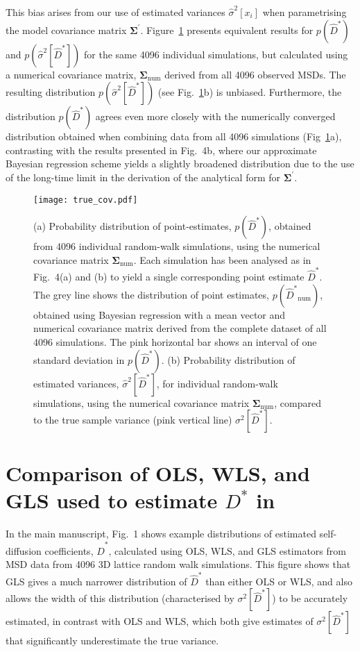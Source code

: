 \documentclass[reprint,superscriptaddress,nobibnotes,amsmath,amssymb,aps,prx,hidelinks]{revtex4-2}
\newcommand{\oMSDi}{\ensuremath{x_i}}
\newcommand{\prob}[1]{\ensuremath{p(#1)}}
\newcommand{\Dest}{\ensuremath{\widehat{D}^*}}
\newcommand{\D}{\ensuremath{D^*}}
\newcommand{\var}[1]{\ensuremath{\sigma^2[#1]}}
\newcommand{\varest}[1]{\ensuremath{\widehat{\sigma}^2[#1]}}
\begin{document}
This bias arises from our use of estimated variances $\varest{\oMSDi}$ when parametrising the model covariance matrix $\bm{\Sigma^\prime}$.
Figure~\ref{fig:true_cov} presents equivalent results for $\prob{\Dest}$ and $\prob{\varest{\Dest}}$ for the same \num{4096} individual simulations, but calculated using a numerical covariance matrix, $\bm{\Sigma}_\mathrm{num}$ derived from all \num{4096} observed MSDs.
The resulting distribution $\prob{\varest{\Dest}}$ (see Fig.~\ref{fig:true_cov}b) is unbiased.
Furthermore, the distribution $\prob{\Dest}$ agrees even more closely with the numerically converged distribution obtained when combining data from all \num{4096} simulations (Fig~\ref{fig:true_cov}a), contrasting with the results presented in Fig.~4b, where our approximate Bayesian regression scheme yields a slightly broadened distribution due to the use of the long-time limit in the derivation of the analytical form for $\bm{\Sigma^\prime}$.
\begin{figure}[tb!]
    \centering
    \texttt{[image: true\_cov.pdf]}
    \caption{
        (a) Probability distribution of point-estimates, $\prob{\Dest}$, obtained from \num{4096} individual random-walk simulations, using the numerical covariance matrix $\bm{\Sigma}_\mathrm{num}$.
        Each simulation has been analysed as in Fig.~4(a) and (b) to yield a single corresponding point estimate $\Dest$.
        The grey line shows the distribution of point estimates, $\prob{\Dest_\mathrm{num}}$, obtained using Bayesian regression with a mean vector and numerical covariance matrix derived from the complete dataset of all \num{4096} simulations.
        The pink horizontal bar shows an interval of one standard deviation in $\prob{\Dest}$.
        (b) Probability distribution of estimated variances, $\varest{\Dest}$, for individual random-walk simulations, using the numerical covariance matrix $\bm{\Sigma}_\mathrm{num}$, compared to the true sample variance (pink vertical line) $\var{\Dest}$.
        }
    \label{fig:true_cov}
\end{figure}

\section{Comparison of OLS, WLS, and GLS used to estimate $\D$ in }
\label{sec:llzo}
In the main manuscript, Fig.~1 shows example distributions of estimated self-diffusion coefficients, $\Dest$, calculated using OLS, WLS, and GLS estimators from MSD data from \num{4096} 3D lattice random walk simulations.
This figure shows that GLS gives a much narrower distribution of $\Dest$ than either OLS or WLS, and also allows the width of this distribution (characterised by $\var{\Dest}$) to be accurately estimated, in contrast with OLS and WLS, which both give estimates of $\var{\Dest}$ that significantly underestimate the true variance.
\end{document}
